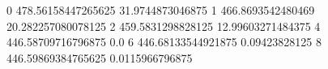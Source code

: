 0 478.56158447265625 31.9744873046875
1 466.8693542480469 20.282257080078125
2 459.5831298828125 12.99603271484375
4 446.58709716796875 0.0
6 446.68133544921875 0.09423828125
8 446.59869384765625 0.0115966796875
